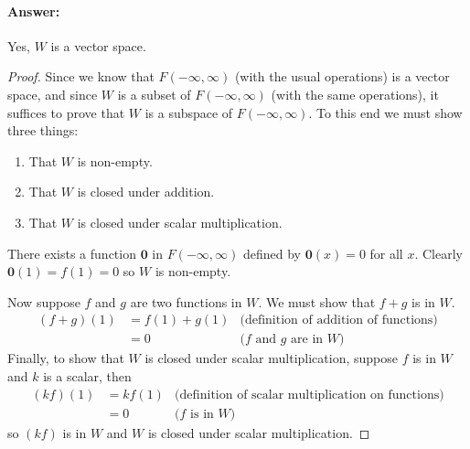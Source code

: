 \documentclass[12pt]{article}
\begin{document}
\begin{enumerate}
              \paragraph{Answer:} Yes, $W$ is a vector space.
              \begin{proof}
                      Since we know that $F(-\infty, \infty)$ (with the usual operations) is a vector space,
                      and since $W$ is a subset of $F(-\infty, \infty)$ (with the same operations),
                      it suffices to prove that $W$ is a subspace of $F(-\infty, \infty)$.
                      To this end we must show three things:
                      \begin{enumerate}
                              \item That $W$ is non-empty.
                              \item That $W$ is closed under addition.
                              \item That $W$ is closed under scalar multiplication.
                      \end{enumerate}
                      There exists a function $\mathbf{0}$ in $F(-\infty, \infty)$ defined by $\mathbf{0}(x)=0$ for all $x$.
                      Clearly $\mathbf{0}(1)=f(1)=0$ so $W$ is non-empty.

                      Now suppose $f$ and $g$ are two functions in $W$. We must show that $f+g$ is in $W$.
                      \begin{align*}
                              (f+g)(1) & = f(1) + g(1) & \textrm{(definition of addition of functions)} \\
                                       & = 0           & \textrm{($f$ and $g$ are in $W$)}
                      \end{align*}
                      Finally, to show that $W$ is closed under scalar multiplication, suppose $f$ is in $W$ and $k$ is a scalar, then
                      \begin{align*}
                              (kf)(1) & = kf(1) & \textrm{(definition of scalar multiplication on functions)} \\
                                      & = 0     & \textrm{($f$ is in $W$)}
                      \end{align*}
                      so $(kf)$ is in $W$ and $W$ is closed under scalar multiplication.


\end{proof}
\end{enumerate}
\end{document}
